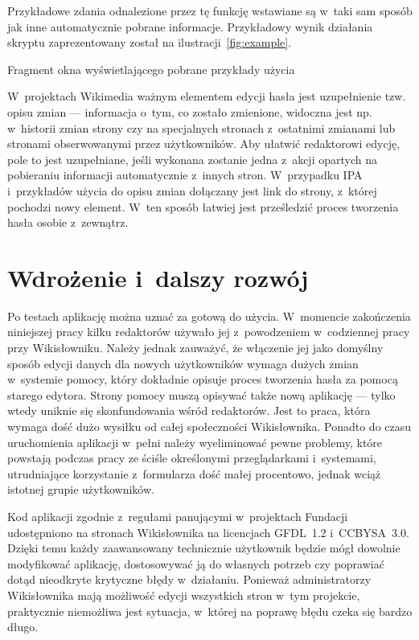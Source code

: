 Przykładowe zdania odnalezione przez tę funkcję wstawiane są w~taki sam sposób jak inne automatycznie pobrane informacje. Przykładowy wynik działania skryptu zaprezentowany został na ilustracji~\ref{fig:example}.

\begin{illustration}
	\caption{Fragment okna wyświetlającego pobrane przykłady użycia}
	\label{fig:example}
\end{illustration}

W~projektach Wikimedia ważnym elementem edycji hasła jest uzupełnienie tzw. opisu zmian --- informacja o~tym, co zostało zmienione, widoczna jest np. w~historii zmian strony czy na specjalnych stronach z~ostatnimi zmianami lub stronami obserwowanymi przez użytkowników. Aby ułatwić redaktorowi edycję, pole to jest uzupełniane, jeśli wykonana zostanie jedna z~akcji opartych na pobieraniu informacji automatycznie z~innych stron. W~przypadku IPA i~przykładów użycia do opisu zmian dołączany jest link do strony, z~której pochodzi nowy element. W~ten sposób łatwiej jest prześledzić proces tworzenia hasła osobie z~zewnątrz.

\section{Wdrożenie i~dalszy rozwój}
\label{sec:impl-deploy}

Po testach aplikację można uznać za gotową do użycia. W~momencie zakończenia niniejszej pracy kilku redaktorów używało jej z~powodzeniem w~codziennej pracy przy Wikisłowniku. Należy jednak zauważyć, że włączenie jej jako domyślny sposób edycji danych dla nowych użytkowników wymaga dużych zmian w~systemie pomocy, który dokładnie opisuje proces tworzenia hasła za pomocą starego edytora. Strony pomocy muszą opisywać także nową aplikację --- tylko wtedy uniknie się skonfundowania wśród redaktorów. Jest to praca, która wymaga dość dużo wysiłku od całej społeczności Wikisłownika. Ponadto do czasu uruchomienia aplikacji w~pełni należy wyeliminować pewne problemy, które powstają podczas pracy ze ściśle określonymi przeglądarkami i~systemami, utrudniające korzystanie z~formularza dość małej procentowo, jednak wciąż istotnej grupie użytkowników.

Kod aplikacji zgodnie z~regułami panującymi w~projektach Fundacji udostępniono na stronach Wikisłownika na licencjach GFDL~1.2 i~CC\dywiz{}BY\dywiz{}SA~3.0. Dzięki temu każdy zaawansowany technicznie użytkownik będzie mógł dowolnie modyfikować aplikację, dostosowywać ją do własnych potrzeb czy poprawiać dotąd nieodkryte krytyczne błędy w~działaniu. Ponieważ administratorzy Wikisłownika mają możliwość edycji wszystkich stron w~tym projekcie, praktycznie niemożliwa jest sytuacja, w~której na poprawę błędu czeka się bardzo długo.


